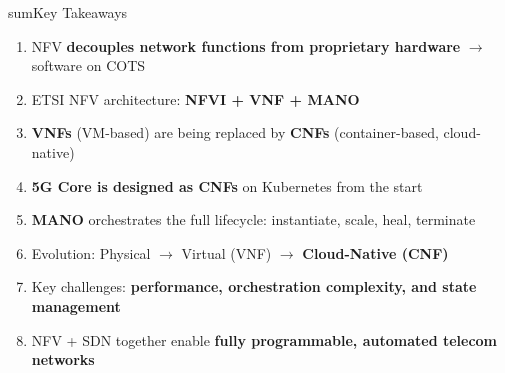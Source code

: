 
\begin{CNbox}[unbreakable]{sum}{Key Takeaways}

\begin{enumerate}
\def\labelenumi{\arabic{enumi}.}
\tightlist
\item
  NFV \textbf{decouples network functions from proprietary hardware} \ensuremath{\to} software on COTS
\item
  ETSI NFV architecture: \textbf{NFVI + VNF + MANO}
\item
  \textbf{VNFs} (VM-based) are being replaced by \textbf{CNFs} (container-based, cloud-native)
\item
  \textbf{5G Core is designed as CNFs} on Kubernetes from the start
\item
  \textbf{MANO} orchestrates the full lifecycle: instantiate, scale, heal, terminate
\item
  Evolution: Physical \ensuremath{\to} Virtual (VNF) \ensuremath{\to} \textbf{Cloud-Native (CNF)}
\item
  Key challenges: \textbf{performance, orchestration complexity, and state management}
\item
  NFV + SDN together enable \textbf{fully programmable, automated telecom networks}
\end{enumerate}

\end{CNbox}
